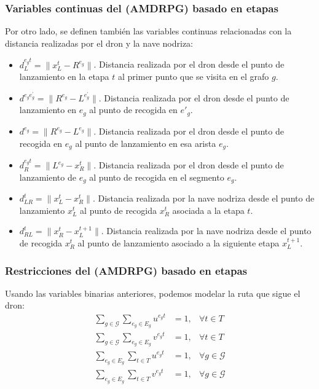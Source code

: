 \documentclass[slidestop,usepdftitle=false, xcolor=table]{beamer}
\begin{document}
\begin{frame}
	\frametitle{Variables continuas del (AMDRPG) basado en etapas}
	
\begin{footnotesize}
	Por otro lado, se definen también las variables continuas relacionadas con la distancia realizadas por el dron y la nave nodriza:
	\begin{itemize}
    \item $d_L^{e_gt} = \|x_L^t - R^{e_g}\|$. Distancia realizada por el dron desde el punto de lanzamiento en la etapa $t$ al primer punto que se visita en el grafo $g$. 
    \item $d^{e_ge^\prime_g} = \|R^{e_g} - L^{e^\prime_g}\|$. Distancia realizada por el dron desde el punto de lanzamiento en $e_g$ al punto de recogida en $e'_g$.
    \item $d^{e_g} = \|R^{e_g} - L^{e_g}\|$. Distancia realizada por el dron desde el punto de recogida en $e_g$ al punto de lanzamiento en esa arista $e_g$.
    \item $d_R^{e_gt} = \|L^{e_g} - x_R^t\|$. Distancia realizada por el dron desde el punto de lanzamiento de $e_g$ al punto de recogida en el segmento $e_g$.
    \item $d_{LR}^t = \|x_L^t - x_R^t\|$. Distancia realizada por la nave nodriza desde el punto de lanzamiento $x_L^t$ al punto de recogida $x_R^t$ asociada a la etapa $t$.
    \item $d_{RL}^t = \|x_R^t - x_L^{t+1}\|$. Distancia realizada por la nave nodriza desde el punto de recogida $x_R^t$ al punto de lanzamiento asociado a la siguiente etapa $x_L^{t+1}$.
\end{itemize}
\end{footnotesize}

\end{frame}

	\begin{frame}
		\frametitle{Restricciones del (AMDRPG) basado en etapas}
		Usando las variables binarias anteriores, podemos modelar la ruta que sigue el dron:
		\begin{align}
    \sum_{g\in \mathcal G}\sum_{e_g\in E_g} u^{e_gt} & = 1, &\forall t\in T \label{st:DEnt}\\%
    \sum_{g\in\mathcal G}\sum_{e_g\in E_g} v^{e_gt} & = 1, &\forall t\in T \label{st:DExt}\\%
    \sum_{e_g\in E_g} \sum_{t\in T} u^{e_gt} & = 1, &\forall g\in\mathcal G \label{st:DEng}\\%
    \sum_{e_g\in E_g}\sum_{t\in T} v^{e_gt} & = 1, &\forall g\in\mathcal G \label{st:DExg}%
\end{align}

	\end{frame}
\end{document}
